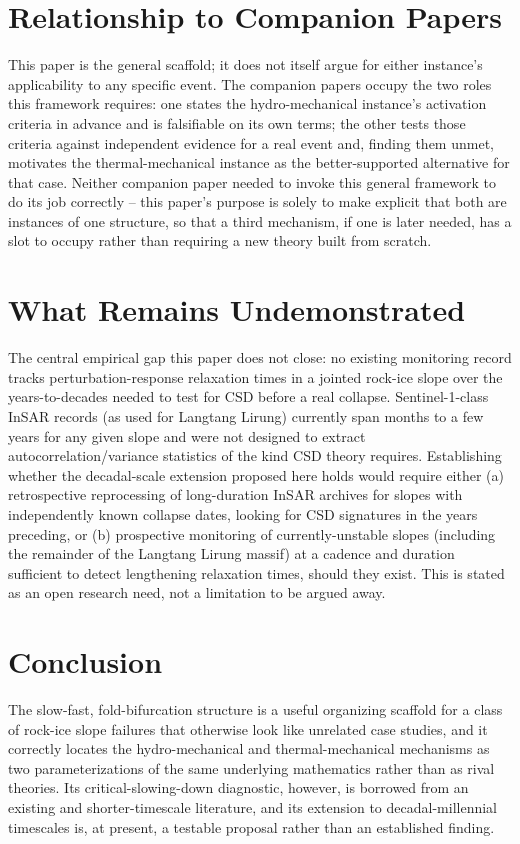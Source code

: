 \documentclass[11pt,twocolumn]{article}
\begin{document}
\section{Relationship to Companion Papers}
This paper is the general scaffold; it does not itself argue for either instance's applicability to any specific event. The companion papers occupy the two roles this framework requires: one states the hydro-mechanical instance's activation criteria in advance and is falsifiable on its own terms; the other tests those criteria against independent evidence for a real event and, finding them unmet, motivates the thermal-mechanical instance as the better-supported alternative for that case. Neither companion paper needed to invoke this general framework to do its job correctly -- this paper's purpose is solely to make explicit that both are instances of one structure, so that a third mechanism, if one is later needed, has a slot to occupy rather than requiring a new theory built from scratch.

\section{What Remains Undemonstrated}
The central empirical gap this paper does not close: no existing monitoring record tracks perturbation-response relaxation times in a jointed rock-ice slope over the years-to-decades needed to test for CSD before a real collapse. Sentinel-1-class InSAR records (as used for Langtang Lirung) currently span months to a few years for any given slope and were not designed to extract autocorrelation/variance statistics of the kind CSD theory requires. Establishing whether the decadal-scale extension proposed here holds would require either (a) retrospective reprocessing of long-duration InSAR archives for slopes with independently known collapse dates, looking for CSD signatures in the years preceding, or (b) prospective monitoring of currently-unstable slopes (including the remainder of the Langtang Lirung massif) at a cadence and duration sufficient to detect lengthening relaxation times, should they exist. This is stated as an open research need, not a limitation to be argued away.

\section{Conclusion}
The slow-fast, fold-bifurcation structure is a useful organizing scaffold for a class of rock-ice slope failures that otherwise look like unrelated case studies, and it correctly locates the hydro-mechanical and thermal-mechanical mechanisms as two parameterizations of the same underlying mathematics rather than as rival theories. Its critical-slowing-down diagnostic, however, is borrowed from an existing and shorter-timescale literature, and its extension to decadal-millennial timescales is, at present, a testable proposal rather than an established finding.
\end{document}
